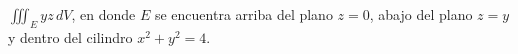 \item $\iiint_E yz \, dV$, en donde $E$ se encuentra arriba del plano $z = 0$, abajo del plano $z = y$ y dentro del cilindro $x^2 + y^2 = 4$.
